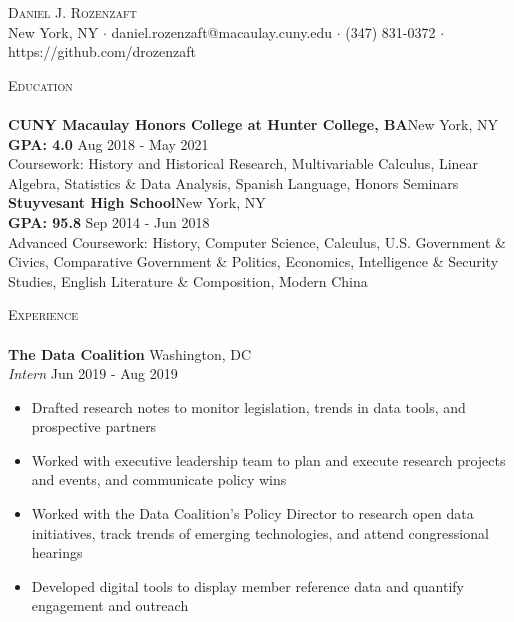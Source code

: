 \documentclass[a4paper]{article}
\newcommand{\lineunder} {
    \vspace*{-8pt} \\
    \hspace*{-18pt} \hrulefill \\
}
\newcommand{\header} [1] {
    {\hspace*{-18pt}\vspace*{6pt} \textsc{#1}}
    \vspace*{-6pt} \lineunder
}
\begin{document}

\begin{center}

  {\Huge \scshape \vspace{-13mm} \hspace{-8mm} {Daniel J. Rozenzaft} \vspace{1mm}}\\
  \hspace{-5mm}  New York, NY $\cdot$ daniel.rozenzaft@macaulay.cuny.edu $\cdot$ (347) 831-0372 $\cdot$ https://github.com/drozenzaft\\
\end{center} \vspace{1mm}
\header{Education}
\textbf{CUNY Macaulay Honors College at Hunter College, BA}\hfill New York, NY\\
\vspace{.5mm} \textbf{GPA: 4.0} 
\hfill Aug 2018 - May 2021\\ \vspace{1mm}
Coursework: History and Historical Research, Multivariable Calculus, Linear Algebra, Statistics \& Data Analysis, Spanish Language, Honors Seminars\\ 
\vspace{3mm}
\textbf{Stuyvesant High School}\hfill New York, NY\\
\vspace{.5mm} \textbf{GPA: 95.8} \hfill Sep 2014 - Jun 2018\\ \vspace{1mm}
Advanced Coursework: History, Computer Science, Calculus, U.S. Government \& Civics, Comparative Government \& Politics, Economics, Intelligence \& Security Studies, English Literature \& Composition, Modern China\\
\vspace{3mm}
\header{Experience}
\textbf{The Data Coalition} \hfill Washington, DC\\
\textit{Intern} \hfill Jun 2019 - Aug 2019\\
\vspace{-1mm}
\begin{itemize} \itemsep 1pt
  \item  Drafted research notes to monitor legislation, trends in data tools, and prospective partners
  \item  Worked with executive leadership team to plan and execute research projects and events, and communicate policy wins 
  \item  Worked with the Data Coalition’s Policy Director to research open data initiatives, track trends of emerging technologies, and attend congressional hearings
  \item  Developed digital tools to display member reference data and quantify engagement and outreach
\end{itemize}
\end{document}
